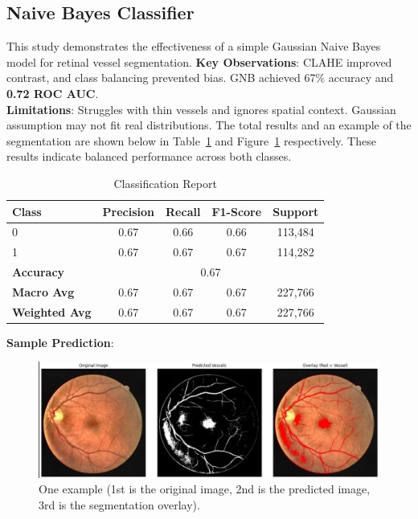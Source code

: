 \documentclass[final]{article}
\begin{document}
\subsection{Naive Bayes Classifier}
This study demonstrates the effectiveness of a simple Gaussian Naive Bayes model for retinal vessel segmentation. \textbf{Key Observations}: CLAHE improved contrast, and class balancing prevented bias. GNB achieved 67\% accuracy and \textbf{0.72 ROC AUC}. \\
\textbf{Limitations}: Struggles with thin vessels and ignores spatial context. Gaussian assumption may not fit real distributions. The total results and an example of the segmentation are shown below in Table~\ref{tab:joe} and Figure~\ref{fig:joe} respectively. These results indicate balanced performance across both classes.
\begin{table}[H]
    \centering
    \caption{Classification Report}
    \begin{tabular}{lcccc}
    \toprule
    \textbf{Class} & \textbf{Precision} & \textbf{Recall} & \textbf{F1-Score} & \textbf{Support} \\
    \midrule
    0 & 0.67 & 0.66 & 0.66 & 113,484 \\
    1 & 0.67 & 0.67 & 0.67 & 114,282 \\
    \midrule
    \textbf{Accuracy} & \multicolumn{4}{c}{0.67} \\
    \textbf{Macro Avg} & 0.67 & 0.67 & 0.67 & 227,766 \\
    \textbf{Weighted Avg} & 0.67 & 0.67 & 0.67 & 227,766 \\
    \bottomrule
    \end{tabular}
    \label{tab:joe}
\end{table}
\textbf{Sample Prediction}:
\begin{figure}[H]
    \centering
    \centering
    \includegraphics[scale=0.25]{Figures/joe.png}
    \caption{One example (1st is the original image, 2nd is the predicted image, 3rd is the segmentation overlay).}
    \label{fig:joe}
\end{figure}
\end{document}
